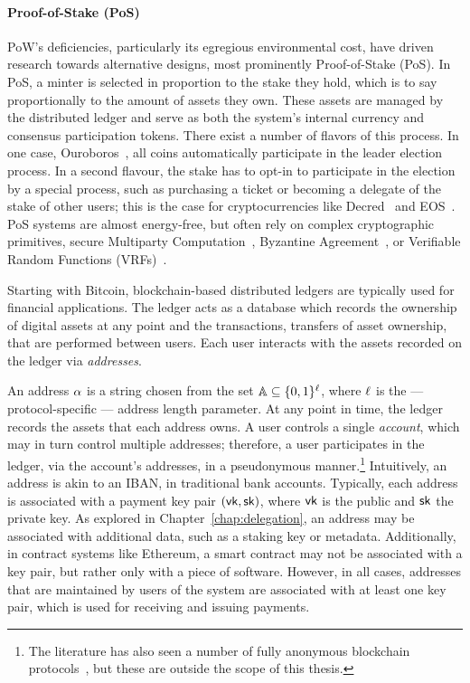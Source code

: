 \paragraph{Proof-of-Stake (PoS)}
PoW's deficiencies, particularly its egregious environmental cost, have driven research towards alternative designs,
most prominently Proof-of-Stake (PoS).  In PoS, a minter is selected in
proportion to the stake they hold, which is to say proportionally to the amount
of assets they own.  These assets are managed by the distributed ledger and
serve as both the system's internal currency and consensus participation
tokens.  There exist a number of flavors of this process. In one case, \eg
Ouroboros~\cite{C:KRDO17}, all coins automatically participate in the leader
election process. In a second flavour, the stake has to opt-in to participate
in the election by a special process, such as purchasing a ticket or becoming a
delegate of the stake of other users; this is the case for cryptocurrencies
like Decred~\cite{decred} and EOS~\cite{eosWhitepaper}. PoS systems are almost
energy-free, but often rely on complex cryptographic primitives, \eg secure
Multiparty Computation~\cite{C:KRDO17}, Byzantine
Agreement~\cite{FC:DaiPasShi19,DBLP:conf/sosp/GiladHMVZ17,USENIX:KJGKGF16}, or
Verifiable Random Functions (VRFs)~\cite{EC:DGKR18,DBLP:conf/sosp/GiladHMVZ17}.

Starting with Bitcoin, blockchain-based distributed ledgers are typically used
for financial applications. The ledger acts as a database which records the
ownership of digital assets at any point and the transactions, \ie transfers of
asset ownership, that are performed between users. Each user interacts with the
assets recorded on the ledger via \emph{addresses}.

An address $\alpha$ is a string chosen from the set $\mathbb{A} \subseteq \{0,
1\}^\ell$, where $\ell$ is the --- protocol-specific --- address length
parameter. At any point in time, the ledger records the assets that each
address owns. A user controls a single \emph{account}, which may in turn
control multiple addresses; therefore, a user participates in the ledger, via
the account's addresses, in a pseudonymous manner.\footnote{The
literature has also seen a number of fully anonymous blockchain
protocols~\cite{SP:BCGGMT14,SP:MGGR13,EC:CGLMMM17,SP:KKKZ19}, but these are outside
the scope of this thesis.} Intuitively, an address is akin to an IBAN, in
traditional bank accounts. Typically, each address is associated with a payment
key pair $(\mathsf{vk}, \mathsf{sk})$, where $\mathsf{vk}$ is the public and $\mathsf{sk}$ the private
key. As explored in Chapter~\ref{chap:delegation}, an address may be associated
with additional data, such as a staking key or metadata. Additionally, in
contract systems like Ethereum, a smart contract may not be associated with a
key pair, but rather only with a piece of software. However, in all cases,
addresses that are maintained by users of the system are associated with at
least one key pair, which is used for receiving and issuing payments.

